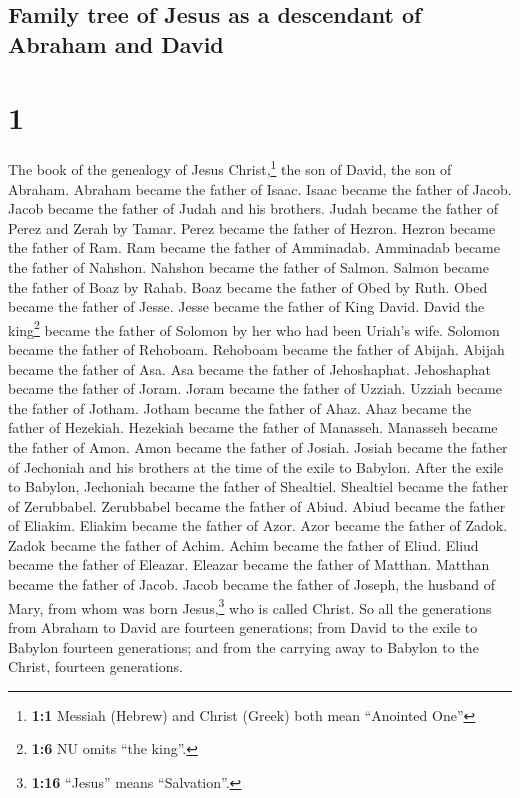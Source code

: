 \hypertarget{family-tree-of-jesus-as-a-descendant-of-abraham-and-david}{%
\subsection{Family tree of Jesus as a descendant of Abraham and
David}\label{family-tree-of-jesus-as-a-descendant-of-abraham-and-david}}

\hypertarget{section}{%
\section{1}\label{section}}

 The book of the genealogy of Jesus Christ,\footnote{\textbf{1:1}
  Messiah (Hebrew) and Christ (Greek) both mean ``Anointed One''} the
son of David, the son of Abraham.  Abraham became the
father of Isaac. Isaac became the father of Jacob. Jacob became the
father of Judah and his brothers.  Judah became the father
of Perez and Zerah by Tamar. Perez became the father of Hezron. Hezron
became the father of Ram.  Ram became the father of
Amminadab. Amminadab became the father of Nahshon. Nahshon became the
father of Salmon.  Salmon became the father of Boaz by
Rahab. Boaz became the father of Obed by Ruth. Obed became the father of
Jesse.  Jesse became the father of King David. David the
king\footnote{\textbf{1:6} NU omits ``the king''.} became the father of
Solomon by her who had been Uriah's wife.  Solomon became
the father of Rehoboam. Rehoboam became the father of Abijah. Abijah
became the father of Asa.  Asa became the father of
Jehoshaphat. Jehoshaphat became the father of Joram. Joram became the
father of Uzziah.  Uzziah became the father of Jotham.
Jotham became the father of Ahaz. Ahaz became the father of Hezekiah.
 Hezekiah became the father of Manasseh. Manasseh became
the father of Amon. Amon became the father of Josiah. 
Josiah became the father of Jechoniah and his brothers at the time of
the exile to Babylon.  After the exile to Babylon,
Jechoniah became the father of Shealtiel. Shealtiel became the father of
Zerubbabel.  Zerubbabel became the father of Abiud. Abiud
became the father of Eliakim. Eliakim became the father of Azor.
 Azor became the father of Zadok. Zadok became the father
of Achim. Achim became the father of Eliud.  Eliud became
the father of Eleazar. Eleazar became the father of Matthan. Matthan
became the father of Jacob.  Jacob became the father of
Joseph, the husband of Mary, from whom was born Jesus,\footnote{\textbf{1:16}
  ``Jesus'' means ``Salvation''.} who is called Christ. 
So all the generations from Abraham to David are fourteen generations;
from David to the exile to Babylon fourteen generations; and from the
carrying away to Babylon to the Christ, fourteen generations.


